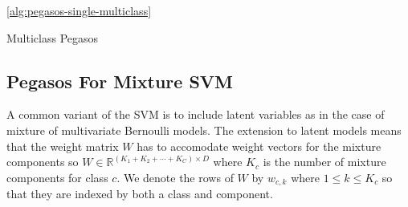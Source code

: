 \documentclass{article}
\begin{document}
\autoref{alg:pegasos-single-multiclass}
\begin{algorithm}[t]
\SetAlgoNoLine
{}

\caption{Multiclass Pegasos}
\label{alg:pegasos-single-multiclass}
\end{algorithm}




\subsection{Pegasos For Mixture SVM}
\label{sec:mixture-svm-pegasos}
A common variant of the SVM is to include  latent variables
as in the case of mixture of multivariate Bernoulli models.
The extension to latent models means that the weight matrix
$W$ has to accomodate weight vectors for the mixture components
so $W\in \mathbb{R}^{(K_1+K_2+\cdots+K_C)\times D}$ where $K_c$ is the
number of mixture components for class $c$.  We denote the
rows of $W$ by $w_{c,k}$ where $1\leq k\leq K_c$ so that they
are indexed by both a class and component. 
\end{document}
